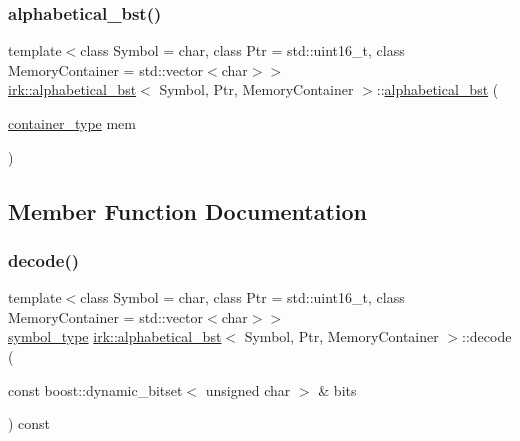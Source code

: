 \mbox{\label{classirk_1_1alphabetical__bst_a21a5c2844dc3bf7bb86e6fa86df2c4c4}} 
\subsubsection{\texorpdfstring{alphabetical\+\_\+bst()}{alphabetical\_bst()}\hspace{0.1cm}{\footnotesize\ttfamily [2/2]}}
{\footnotesize\ttfamily template$<$class Symbol = char, class Ptr = std\+::uint16\+\_\+t, class Memory\+Container = std\+::vector$<$char$>$$>$ \\
\mbox{\hyperlink{classirk_1_1alphabetical__bst}{irk\+::alphabetical\+\_\+bst}}$<$ Symbol, Ptr, Memory\+Container $>$\+::\mbox{\hyperlink{classirk_1_1alphabetical__bst}{alphabetical\+\_\+bst}} (\begin{DoxyParamCaption}\item[{\mbox{\hyperlink{classirk_1_1alphabetical__bst_aeed9efc6a48ff6d504a608e06223f386}{container\+\_\+type}}}]{mem }\end{DoxyParamCaption})\hspace{0.3cm}{\ttfamily [inline]}}



\subsection{Member Function Documentation}
\mbox{\label{classirk_1_1alphabetical__bst_ab692b132ff3a1e9f27f95af247437e1d}} 
\subsubsection{\texorpdfstring{decode()}{decode()}\hspace{0.1cm}{\footnotesize\ttfamily [1/2]}}
{\footnotesize\ttfamily template$<$class Symbol = char, class Ptr = std\+::uint16\+\_\+t, class Memory\+Container = std\+::vector$<$char$>$$>$ \\
\mbox{\hyperlink{classirk_1_1alphabetical__bst_a296ccb8fa9fa9dce3b3c3beab0a5ca28}{symbol\+\_\+type}} \mbox{\hyperlink{classirk_1_1alphabetical__bst}{irk\+::alphabetical\+\_\+bst}}$<$ Symbol, Ptr, Memory\+Container $>$\+::decode (\begin{DoxyParamCaption}\item[{const boost\+::dynamic\+\_\+bitset$<$ unsigned char $>$ \&}]{bits }\end{DoxyParamCaption}) const\hspace{0.3cm}{\ttfamily [inline]}}

